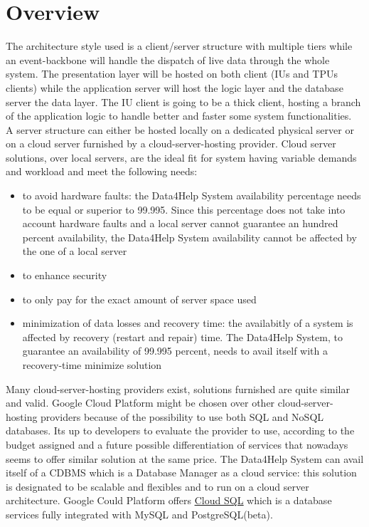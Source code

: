 \section{Overview}
The architecture style used is a client/server structure with multiple tiers while an event-backbone will handle the dispatch of live data through the whole system. The presentation layer will be hosted on both client (IUs and TPUs clients) while the application server will host the logic layer and the database server the data layer. The IU client is going to be a thick client, hosting a branch of the application logic to handle better and faster some system functionalities. \\ 
A server structure can either be hosted locally on a dedicated physical server or on a cloud server furnished by a cloud-server-hosting provider.
Cloud server solutions, over local servers, are the ideal fit for system having variable demands and workload and meet the following needs:
\begin{itemize}
\item to avoid hardware faults: the Data4Help System availability percentage needs to be equal or superior to 99.995. Since this percentage does not take into account hardware faults and a local server cannot guarantee an hundred percent availability, the Data4Help System availability cannot be affected by the one of a local server
\item to enhance security
\item to only pay for the exact amount of server space used
\item minimization of data losses and recovery time: the availabitly of a system is affected by recovery (restart and repair) time. The Data4Help System, to guarantee an availability of 99.995 percent, needs to avail itself with a recovery-time minimize solution
\end{itemize} 
Many cloud-server-hosting providers exist, solutions furnished are quite similar and valid.
Google Cloud Platform might be chosen over other cloud-server-hosting providers because of the possibility to use both SQL and NoSQL databases. It\textquotesingle s up to developers to evaluate the provider to use, according to the budget assigned and a future possible differentiation of services that nowadays seems to offer similar solution at the same price. The
Data4Help System can avail itself of a CDBMS which is a Database Manager as a cloud service: this solution is designated to be scalable and flexibles and to run on a cloud server architecture. Google Could Platform offers \href{https://cloud.google.com/sql/}{\underline{Cloud SQL}} which is a database services fully integrated with MySQL and PostgreSQL(beta). 
\clearpage 
